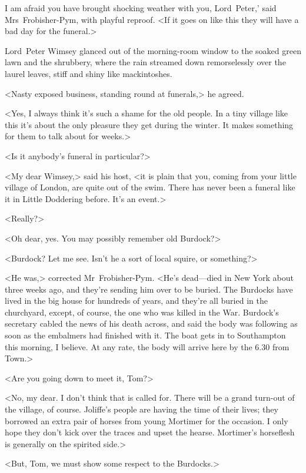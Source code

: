 
\lettrine[ante=‘]{I}{} am afraid you have brought shocking weather with you, Lord~Peter,' said Mrs~Frobisher-Pym, with playful reproof. <If it goes on like this they will have a bad day for the funeral.>

\zz
Lord~Peter Wimsey glanced out of the morning-room window to the soaked green lawn and the shrubbery, where the rain streamed down remorselessly over the laurel leaves, stiff and shiny like mackintoshes.

<Nasty exposed business, standing round at funerals,> he agreed.

<Yes, I always think it's such a shame for the old people. In a tiny village like this it's about the only pleasure they get during the winter. It makes something for them to talk about for weeks.>

<Is it anybody's funeral in particular?>

<My dear Wimsey,> said his host, <it is plain that you, coming from your little village of London, are quite out of the swim. There has never been a funeral like it in Little Doddering before. It's an event.>

<Really?>

<Oh dear, yes. You may possibly remember old Burdock?>

<Burdock? Let me see. Isn't he a sort of local squire, or something?>

<He was,> corrected Mr~Frobisher-Pym. <He's dead—died in New York about three weeks ago, and they're sending him over to be buried. The Burdocks have lived in the big house for hundreds of years, and they're all buried in the churchyard, except, of course, the one who was killed in the War. Burdock's secretary cabled the news of his death across, and said the body was following as soon as the embalmers had finished with it. The boat gets in to Southampton this morning, I believe. At any rate, the body will arrive here by the 6.30 from Town.>

<Are you going down to meet it, Tom?>

<No, my dear. I don't think that is called for. There will be a grand turn-out of the village, of course. Joliffe's people are having the time of their lives; they borrowed an extra pair of horses from young Mortimer for the occasion. I only hope they don't kick over the traces and upset the hearse. Mortimer's horseflesh is generally on the spirited side.>

<But, Tom, we must show some respect to the Burdocks.>

